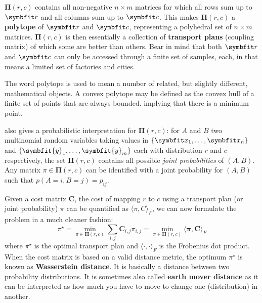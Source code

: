 $\symbf{\Pi}(r, c)$ contains all non-negative $n \times m$ matrices for which all rows sum up to $\bfitr$ and all columns sum up to $\bfitc$. 
This makes $\symbf{\Pi}(r, c)$ a \textbf{polytope} of $\bfitr$ and $\bfitc$, representing a polyhedral set of $n \times m$ matrices.
$\symbf{\Pi}(r, c)$ is then essentially a collection of \textbf{transport plans} (coupling matrix) of which some are better than others.
Bear in mind that both $\bfitr$ and $\bfitc$ can only be accessed through a finite set of samples, each, in  that means a limited set of factories and cities.

\begin{tcolorbox}[title=Polytope]
The word polytope is used to mean a number of related, but slightly different, mathematical objects. A convex polytope may be defined as the convex hull of a finite set of points that are always bounded.  implying that there is a minimum point.
\end{tcolorbox}

\textcite{cuturi2013sinkhorn} also gives a probabilistic interpretation for $\symbf{\Pi}(r, c)$: for $A$ and $B$ two multinomial random variables taking values in  $\{\bfitx_1, \ldots, \bfitx_n\}$ and  $\{\symbfit{y}_1, \ldots, \symbfit{y}_m\}$ each with distribution $r$ and $c$ respectively, the set $\symbf{\Pi}(r, c)$ contains all possible \textit{joint probabilities} of $(A, B)$. Any matrix $\pi \in \symbf{\Pi}(r, c)$ can be identified with a joint probability for $(A, B)$ such that $p(A = i, B = j) = p_{ij}$.

Given a cost matrix $\symbf{C}$, the cost of mapping $r$ to $c$ using a transport plan (or joint probability) $\pi$ can be quantified as $\langle \pi, C \rangle_{F}$, we can now formulate the problem in a much cleaner fashion:
\begin{equation}
    \pi^\star = \min_{\pi \in \symbf{\Pi}(r, c)} \sum_{i,j} \symbf{C}_{i,j}{\pi}_{i,j} = \min_{\pi \in \symbf{\Pi}(r, c)} \langle \symbf{\pi}, \symbf{C} \rangle_{F}
    \label{eqn:ot-objective-relaxed}
\end{equation}
where $\pi^\star$ is the optimal transport plan and $\langle \cdot, \cdot \rangle_{F}$ is the Frobenius dot product. When the cost matrix is based on a valid distance metric, the optimum $\pi^\star$ is known as \textbf{Wasserstein distance}. It is basically a distance between two probability distributions. It is sometimes also called \textbf{earth mover distance} as it can be interpreted as how much  you have to move to change one  (distribution) in another.

